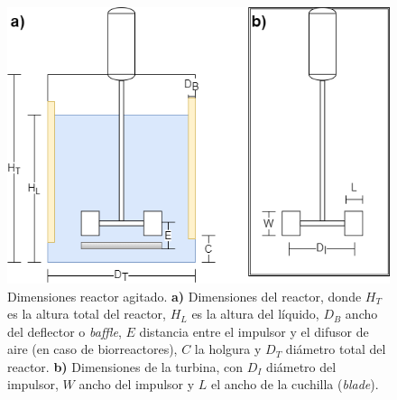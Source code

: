             \begin{figure}
                \centering
                \includegraphics[width=.7\textwidth]{img/diagramas/Dimensiones Reactor Agitado.png}
                \caption[Dimensiones reactor agitado]{Dimensiones reactor agitado. \textbf{a)} Dimensiones del reactor, donde \(H_{T}\) es la altura total del reactor, \(H_{L}\) es la altura del líquido, \(D_{B}\) ancho del deflector o \textit{baffle}, \(E\) distancia entre el impulsor y el difusor de aire (en caso de biorreactores), \(C\) la holgura y \(D_{T}\) diámetro total del reactor. \textbf{b)} Dimensiones de la turbina, con \(D_{I}\) diámetro del impulsor, \(W\) ancho del impulsor y \(L\) el ancho de la cuchilla (\textit{blade}).}
                \label{fig:dimensiones_reactor_agitado}
            \end{figure}
            
